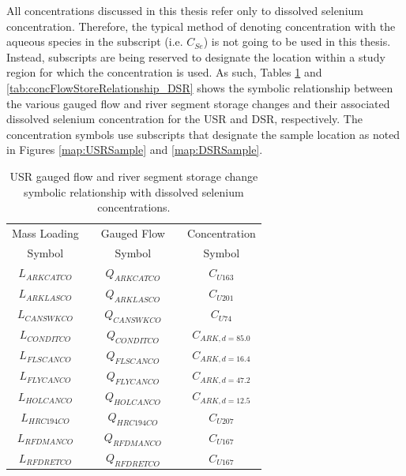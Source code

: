 \begin{linenumbers}
All concentrations discussed in this thesis refer only to dissolved selenium concentration.  Therefore, the typical method of denoting concentration with the aqueous species in the subscript (i.e. $ C_{Se} $) is not going to be used in this thesis.  Instead, subscripts are being reserved to designate the location within a study region for which the concentration is used.  As such, Tables \ref{tab:concFlowStoreRelationship_USR} and \ref{tab:concFlowStoreRelationship_DSR} shows the symbolic relationship between the various gauged flow and  river segment storage changes and their associated dissolved selenium concentration for the USR and DSR, respectively.  The concentration symbols use subscripts that designate the sample location as noted in Figures \ref{map:USRSample} and \ref{map:DSRSample}.

\begin{table}[htbp]
	\centering
	\caption[USR gauged flow and river segment storage change symbolic relationship with dissolved selenium concentrations. ]{USR gauged flow and river segment storage change symbolic relationship with dissolved selenium concentrations.}
	\label{tab:concFlowStoreRelationship_USR}
	\begin{subtable}{\textwidth}
		\centering
		\begin{tabular}{c c c c c} 
			\toprule  
			Mass Loading & & Gauged Flow & & Concentration \\
			Symbol & & Symbol & & Symbol\\
			\toprule 
			$ L_{ARKCATCO} $ & & $ Q_{ARKCATCO} $ & & $ C_{U163} $\\
			$ L_{ARKLASCO} $ & & $ Q_{ARKLASCO} $ & & $ C_{U201} $\\
			$ L_{CANSWKCO} $ & & $ Q_{CANSWKCO} $ & & $ C_{U74} $\\
			$ L_{CONDITCO} $ & & $ Q_{CONDITCO} $ & & $ C_{ARK,d=85.0} $\\
			$ L_{FLSCANCO} $ & & $ Q_{FLSCANCO} $ & & $ C_{ARK,d=16.4} $\\
			$ L_{FLYCANCO} $ & & $ Q_{FLYCANCO} $ & & $ C_{ARK,d=47.2} $\\
			$ L_{HOLCANCO} $ & & $ Q_{HOLCANCO} $ & & $ C_{ARK,d=12.5} $\\
			$ L_{HRC194CO} $ & & $ Q_{HRC194CO} $ & & $ C_{U207} $\\
			$ L_{RFDMANCO} $ & & $ Q_{RFDMANCO} $ & & $ C_{U167} $\\
			$ L_{RFDRETCO} $ & & $ Q_{RFDRETCO} $ & & $ C_{U167} $\\

\end{tabular}
\end{subtable}
\end{table}
\end{linenumbers}
